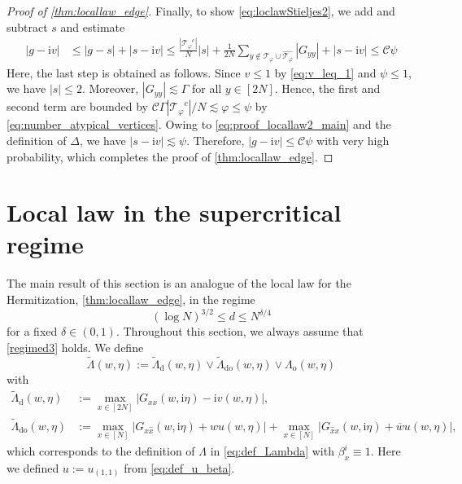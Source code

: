 \documentclass[10pt,a4paper]{amsart}
\newcommand{\ii}{\mathrm{i}}
\newcommand{\abs}[1]{\left| #1 \right|}
\numberwithin{equation}{section}
\newcommand*\ubarr[1]{{\widehat{#1}}}
\begin{document}
\begin{proof}[Proof of \cref{thm:locallaw_edge}]
		Finally, to show \cref{eq:loclawStieljes2}, we add and subtract $s$ and estimate 
	\begin{align*}
 \abs{g-\ii v} & \leq \abs{g-s} + \abs{s-\ii v} 
  \leq \frac{\abs{{\mathcal T_{\varphi}}^c}}{N} \abs{s} + \frac{1}{2N} \sum_{y \notin \mathcal T_{\varphi} \cup \widehat{\mathcal T_{\varphi}}}  \abs{G_{yy}}  + \abs{s-\ii v} \leq \mathcal C \psi 
 	\end{align*}
 	Here, the last step is obtained as follows. 
	Since $v\leq 1$ by \cref{eq:v_leq_1} and $\psi \leq 1$, we have $\abs{s} \leq 2$. 
	Moreover, $\abs{G_{yy}} \lesssim \Gamma$ for all $y \in [2N]$. 
	Hence, the first and second term are bounded by $\mathcal C \Gamma \abs{{\mathcal T_{\varphi}}^c}/N \lesssim \varphi \leq \psi$ by \cref{eq:number_atypical_vertices}. 
	Owing to \cref{eq:proof_locallaw2_main} and the definition of $\Delta$, we have $\abs{s-\ii v} \lesssim \psi$. 
		Therefore, $\abs{g-\ii v} \leq \mathcal C \psi$ with very high probability, which completes the proof of \cref{thm:locallaw_edge}.
	\end{proof}
	
	\section{Local law in the supercritical regime}\label{section:loc_law_supercritical}
	
	The main result of this section is an analogue of the local law for the Hermitization, \cref{thm:locallaw_edge}, in the regime 
	\begin{equation}\label{regimed3} 
		( \log N)^{3/2} \le  d \le N^{\delta/4}
	\end{equation}
	for a fixed $\delta \in (0,1)$. Throughout this section, we always assume that \eqref{regimed3} holds. 
	We define  
	\[ \widetilde{\Lambda}(w, \eta) := \widetilde{\Lambda}_\mathrm{d}(w,\eta)  \vee \widetilde{\Lambda}_{\mathrm{do}}(w,\eta) \vee {\Lambda}_{\mathrm{o}}(w,\eta) \] 
	with 
	\begin{align*} 
		\widetilde{\Lambda}_\mathrm{d}(w,\eta) & := \max_{x \in [2N]}\abs{G_{xx}(w,\ii \eta) - \ii v(w, \eta)}, 
		\\ 
		\widetilde{\Lambda}_{\mathrm{do}}(w,\eta)  & := \max_{x \in [N]} \abs{G_{x\ubarr{x}}(w,\ii\eta)+w u(w,\eta)} +   
		\max_{x \in [N]}\abs{G_{\ubarr{x}x}(w,\ii\eta)+ \overline{w} u(w,\eta)},  
	\end{align*} 
	which corresponds to the definition of $\Lambda$ in \cref{eq:def_Lambda} with $\beta_x^i \equiv 1$. Here we defined
	$u := u_{(1,1)}$ from \eqref{eq:def_u_beta}. 
	
\end{document}
